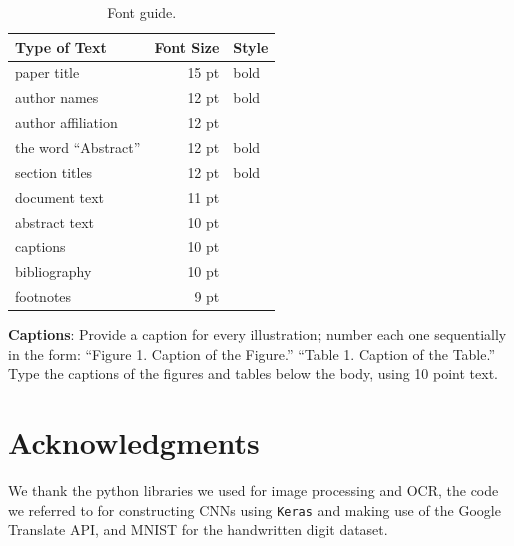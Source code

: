 \documentclass[11pt,letterpaper]{article}
\begin{document}
\begin{table}
\begin{center}
\begin{tabular}{|l|rl|}
\hline \bf Type of Text & \bf Font Size & \bf Style \\ \hline
paper title & 15 pt & bold \\
author names & 12 pt & bold \\
author affiliation & 12 pt & \\
the word ``Abstract'' & 12 pt & bold \\
section titles & 12 pt & bold \\
document text & 11 pt  &\\
abstract text & 10 pt & \\
captions & 10 pt & \\
bibliography & 10 pt & \\
footnotes & 9 pt & \\
\hline
\end{tabular}
\end{center}
\caption{\label{font-table} Font guide. }
\end{table}

{\bf Captions}: Provide a caption for every illustration; number each one
sequentially in the form:  ``Figure 1. Caption of the Figure.'' ``Table 1.
Caption of the Table.''  Type the captions of the figures and 
tables below the body, using 10 point text.  

\section*{Acknowledgments}

We thank the python libraries we used for image processing and OCR, the code we referred to for constructing CNNs using {\tt Keras} and making use of the Google Translate API, and MNIST for the handwritten digit dataset.
\end{document}
